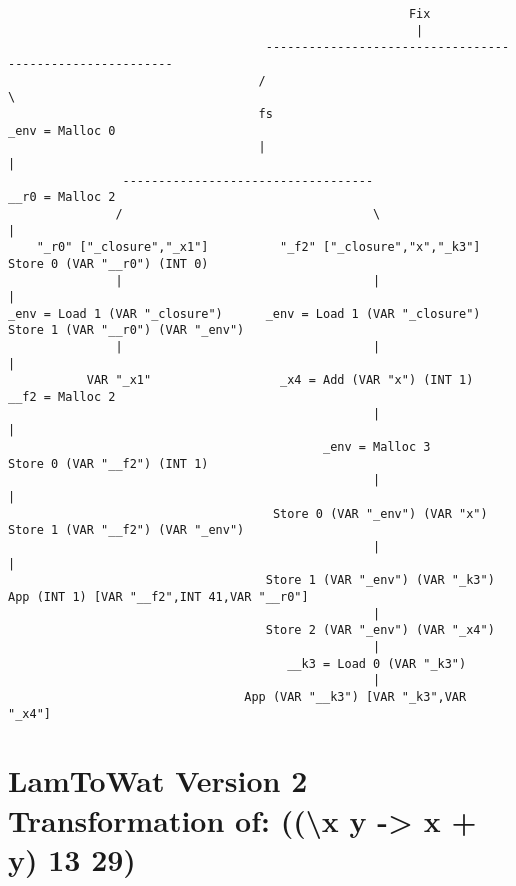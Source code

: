 \begin{landscape}
\begin{lstlisting}
                                                        Fix
                                                         |
                                    ---------------------------------------------------------
                                   /                                                         \
                                   fs                                                 _env = Malloc 0
                                   |                                                         |
                -----------------------------------                                   __r0 = Malloc 2
               /                                   \                                         |
    "_r0" ["_closure","_x1"]          "_f2" ["_closure","x","_k3"]              Store 0 (VAR "__r0") (INT 0)
               |                                   |                                         |
_env = Load 1 (VAR "_closure")      _env = Load 1 (VAR "_closure")           Store 1 (VAR "__r0") (VAR "_env")
               |                                   |                                         |
           VAR "_x1"                  _x4 = Add (VAR "x") (INT 1)                     __f2 = Malloc 2
                                                   |                                         |
                                            _env = Malloc 3                     Store 0 (VAR "__f2") (INT 1)
                                                   |                                         |
                                     Store 0 (VAR "_env") (VAR "x")          Store 1 (VAR "__f2") (VAR "_env")
                                                   |                                         |
                                    Store 1 (VAR "_env") (VAR "_k3")     App (INT 1) [VAR "__f2",INT 41,VAR "__r0"]
                                                   |
                                    Store 2 (VAR "_env") (VAR "_x4")
                                                   |
                                       __k3 = Load 0 (VAR "_k3")
                                                   |
                                 App (VAR "__k3") [VAR "_k3",VAR "_x4"]

\end{lstlisting}
\end{landscape}
\clearpage

\section{\label{section:v2printnest}LamToWat Version 2 Transformation of: ((\textbackslash x y -> x + y) 13 29)}

